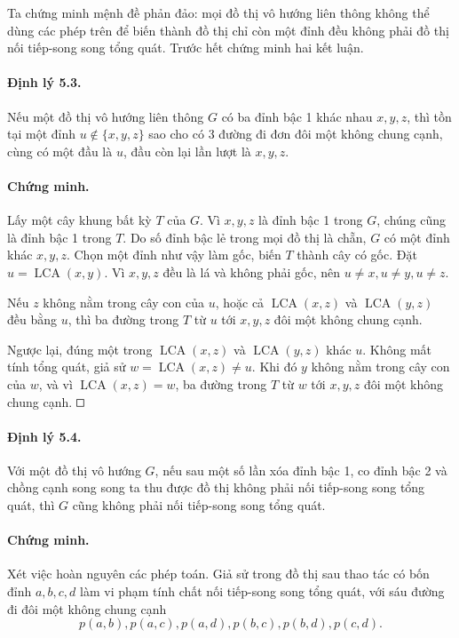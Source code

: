 \documentclass[11pt]{article}
\newcommand{\square}{\mathord{\vcenter{\hrule height .5pt
  \hbox{\vrule width .5pt height 5pt\kern5pt\vrule width .5pt}
  \hrule height .5pt}}}
\begin{document}
Ta chứng minh mệnh đề phản đảo: mọi đồ thị vô hướng liên thông không thể dùng
các phép trên để biến thành đồ thị chỉ còn một đỉnh đều không phải đồ thị nối
tiếp-song song tổng quát. Trước hết chứng minh hai kết luận.

\paragraph{Định lý 5.3.}
Nếu một đồ thị vô hướng liên thông \(G\) có ba đỉnh bậc 1 khác nhau \(x,y,z\),
thì tồn tại một đỉnh \(u\notin\{x,y,z\}\) sao cho có 3 đường đi đơn đôi một
không chung cạnh, cùng có một đầu là \(u\), đầu còn lại lần lượt là \(x,y,z\).

\paragraph{Chứng minh.}
Lấy một cây khung bất kỳ \(T\) của \(G\). Vì \(x,y,z\) là đỉnh bậc 1 trong
\(G\), chúng cũng là đỉnh bậc 1 trong \(T\). Do số đỉnh bậc lẻ trong mọi đồ
thị là chẵn, \(G\) có một đỉnh khác \(x,y,z\). Chọn một đỉnh như vậy làm gốc,
biến \(T\) thành cây có gốc. Đặt \(u=\operatorname{LCA}(x,y)\). Vì \(x,y,z\)
đều là lá và không phải gốc, nên \(u\ne x,u\ne y,u\ne z\).

Nếu \(z\) không nằm trong cây con của \(u\), hoặc cả \(\operatorname{LCA}(x,z)\)
và \(\operatorname{LCA}(y,z)\) đều bằng \(u\), thì ba đường trong \(T\) từ
\(u\) tới \(x,y,z\) đôi một không chung cạnh.

Ngược lại, đúng một trong \(\operatorname{LCA}(x,z)\) và
\(\operatorname{LCA}(y,z)\) khác \(u\). Không mất tính tổng quát, giả sử
\(w=\operatorname{LCA}(x,z)\ne u\). Khi đó \(y\) không nằm trong cây con của
\(w\), và vì \(\operatorname{LCA}(x,z)=w\), ba đường trong \(T\) từ \(w\) tới
\(x,y,z\) đôi một không chung cạnh. \(\square\)

\paragraph{Định lý 5.4.}
Với một đồ thị vô hướng \(G\), nếu sau một số lần xóa đỉnh bậc 1, co đỉnh bậc
2 và chồng cạnh song song ta thu được đồ thị không phải nối tiếp-song song
tổng quát, thì \(G\) cũng không phải nối tiếp-song song tổng quát.

\paragraph{Chứng minh.}
Xét việc hoàn nguyên các phép toán. Giả sử trong đồ thị sau thao tác có bốn
đỉnh \(a,b,c,d\) làm vi phạm tính chất nối tiếp-song song tổng quát, với sáu
đường đi đôi một không chung cạnh
\[
p(a,b),p(a,c),p(a,d),p(b,c),p(b,d),p(c,d).
\]
\end{document}
